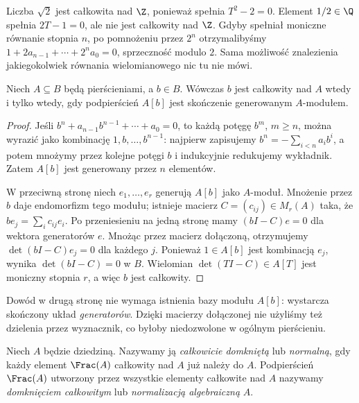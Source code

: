 \begin{przyklad}
Liczba $\sqrt2$ jest całkowita nad $\Z$, ponieważ
spełnia $T^2-2=0$. Element $1/2\in\Q$ spełnia
$2T-1=0$, ale nie jest całkowity nad $\Z$.
Gdyby spełniał moniczne równanie stopnia $n$,
po pomnożeniu przez $2^n$ otrzymalibyśmy
$1+2a_{n-1}+\cdots+2^na_0=0$, sprzeczność
modulo $2$. Sama możliwość znalezienia jakiegokolwiek
równania wielomianowego nic tu nie mówi.
\end{przyklad}

\begin{twierdzenie}
\label{tw:integrality-module}
Niech $A\subseteq B$ będą pierścieniami, a $b\in B$.
Wówczas $b$ jest całkowity nad $A$ wtedy i tylko wtedy,
gdy podpierścień $A[b]$ jest skończenie generowanym
$A$-modułem.
\end{twierdzenie}
\begin{proof}
Jeśli $b^n+a_{n-1}b^{n-1}+\cdots+a_0=0$,
to każdą potęgę $b^m$, $m\ge n$, można wyrazić
jako kombinację $1,b,\ldots,b^{n-1}$: najpierw
zapisujemy $b^n=-\sum_{i<n}a_ib^i$,
a potem mnożymy przez kolejne potęgi $b$ i
indukcyjnie redukujemy wykładnik. Zatem
$A[b]$ jest generowany przez $n$ elementów.

W przeciwną stronę niech $e_1,\ldots,e_r$ generują
$A[b]$ jako $A$-moduł. Mnożenie przez $b$
daje endomorfizm tego modułu; istnieje macierz
$C=(c_{ij})\in M_r(A)$ taka, że
$b e_j=\sum_i c_{ij}e_i$. Po przeniesieniu na jedną
stronę mamy $(bI-C)e=0$ dla wektora generatorów $e$.
Mnożąc przez macierz dołączoną, otrzymujemy
$\det(bI-C)e_j=0$ dla każdego $j$. Ponieważ
$1\in A[b]$ jest kombinacją $e_j$, wynika
$\det(bI-C)=0$ w $B$. Wielomian
$\det(TI-C)\in A[T]$ jest moniczny stopnia $r$,
a więc $b$ jest całkowity.
\end{proof}

\begin{uwaga}
Dowód w drugą stronę nie wymaga istnienia bazy modułu
$A[b]$: wystarcza skończony układ \emph{generatorów}.
Dzięki macierzy dołączonej nie użyliśmy też dzielenia
przez wyznacznik, co byłoby niedozwolone w ogólnym
pierścieniu.
\end{uwaga}

\begin{definicja}
Niech $A$ będzie dziedziną. Nazywamy ją
\emph{całkowicie domkniętą} lub \emph{normalną},
gdy każdy element $\Frac(A)$ całkowity nad $A$
już należy do $A$. Podpierścień $\Frac(A)$
utworzony przez wszystkie elementy całkowite nad $A$
nazywamy \emph{domknięciem całkowitym} lub
\emph{normalizacją algebraiczną} $A$.
\end{definicja}

